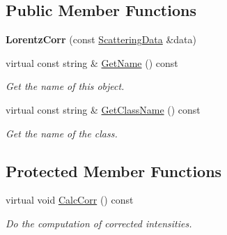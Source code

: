 \subsection*{Public Member Functions}
\begin{DoxyCompactItemize}
\item 
\mbox{\label{class_obj_cryst_1_1_lorentz_corr_a9f814b060cfafe4e829dc3977d9a7f1b}} 
{\bfseries Lorentz\+Corr} (const \mbox{\hyperlink{class_obj_cryst_1_1_scattering_data}{Scattering\+Data}} \&data)
\item 
\mbox{\label{class_obj_cryst_1_1_lorentz_corr_ad92dee1697d67b0a4072cc8d8fe43036}} 
virtual const string \& \mbox{\hyperlink{class_obj_cryst_1_1_lorentz_corr_ad92dee1697d67b0a4072cc8d8fe43036}{Get\+Name}} () const
\begin{DoxyCompactList}\small\item\em Get the name of this object. \end{DoxyCompactList}\item 
\mbox{\label{class_obj_cryst_1_1_lorentz_corr_ad1533626897df4d397f8fe797274d11e}} 
virtual const string \& \mbox{\hyperlink{class_obj_cryst_1_1_lorentz_corr_ad1533626897df4d397f8fe797274d11e}{Get\+Class\+Name}} () const
\begin{DoxyCompactList}\small\item\em Get the name of the class. \end{DoxyCompactList}\end{DoxyCompactItemize}
\subsection*{Protected Member Functions}
\begin{DoxyCompactItemize}
\item 
\mbox{\label{class_obj_cryst_1_1_lorentz_corr_a8f53d904f0bf85b507d1979853d9782a}} 
virtual void \mbox{\hyperlink{class_obj_cryst_1_1_lorentz_corr_a8f53d904f0bf85b507d1979853d9782a}{Calc\+Corr}} () const
\begin{DoxyCompactList}\small\item\em Do the computation of corrected intensities. \end{DoxyCompactList}\end{DoxyCompactItemize}
